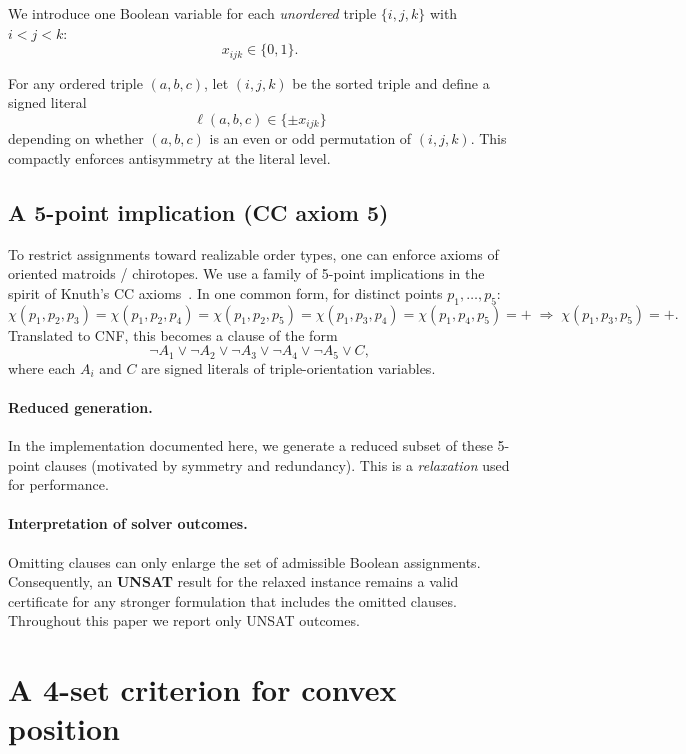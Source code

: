 \documentclass[11pt,a4paper]{article}
\theoremstyle{definition}
\begin{document}
We introduce one Boolean variable for each \emph{unordered} triple $\{i,j,k\}$ with $i<j<k$:
\[
x_{ijk}\in\{0,1\}.
\]

For any ordered triple $(a,b,c)$, let $(i,j,k)$ be the sorted triple and define a signed literal
\[
\ell(a,b,c)\in\{\pm x_{ijk}\}
\]
depending on whether $(a,b,c)$ is an even or odd permutation of $(i,j,k)$. This compactly enforces antisymmetry at the literal level.

\subsection{A 5-point implication (CC axiom 5)}

To restrict assignments toward realizable order types, one can enforce axioms of oriented matroids / chirotopes. We use a family of 5-point implications in the spirit of Knuth's CC axioms~\cite{Knuth1992-ae}. In one common form, for distinct points $p_1,\dots,p_5$:
\[
\chi(p_1,p_2,p_3)=\chi(p_1,p_2,p_4)=\chi(p_1,p_2,p_5)=\chi(p_1,p_3,p_4)=\chi(p_1,p_4,p_5)=+
\;\Longrightarrow\;
\chi(p_1,p_3,p_5)=+.
\]
Translated to CNF, this becomes a clause of the form
\[
\neg A_1 \vee \neg A_2 \vee \neg A_3 \vee \neg A_4 \vee \neg A_5 \vee C,
\]
where each $A_i$ and $C$ are signed literals of triple-orientation variables.

\paragraph{Reduced generation.}
In the implementation documented here, we generate a reduced subset of these 5-point clauses (motivated by symmetry and redundancy). This is a \emph{relaxation} used for performance.

\paragraph{Interpretation of solver outcomes.}
Omitting clauses can only enlarge the set of admissible Boolean assignments. Consequently, an \textbf{UNSAT} result for the relaxed instance remains a valid certificate for any stronger formulation that includes the omitted clauses.
Throughout this paper we report only UNSAT outcomes.

\section{A 4-set criterion for convex position}
\end{document}
